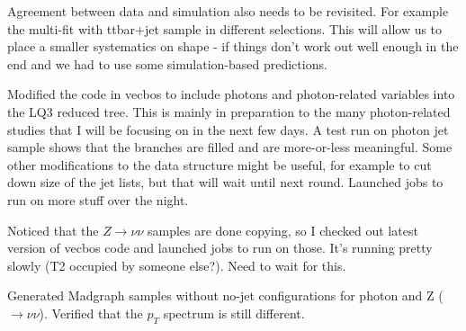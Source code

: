 Agreement between data and simulation also needs to be revisited.  For example the multi-fit with ttbar+jet
sample in different selections.  This will allow us to place a smaller systematics on shape - if things
don't work out well enough in the end and we had to use some simulation-based predictions.



Modified the code in vecbos to include photons and photon-related variables into the LQ3 reduced tree.
This is mainly in preparation to the many photon-related studies that I will be focusing on in the
next few days.  A test run on photon jet sample shows that the branches are filled and are more-or-less
meaningful.  Some other modifications to the data structure might be useful, for example to cut down
size of the jet lists, but that will wait until next round.  Launched jobs to run on more stuff over the night.

Noticed that the $Z\rightarrow\nu\nu$ samples are done copying, so I checked out latest version of
vecbos code and launched jobs to run on those.  It's running pretty slowly (T2 occupied by someone else?).
Need to wait for this.

Generated {\sc Madgraph} samples without no-jet configurations for photon and Z ($\rightarrow\nu\nu$).
Verified that the $p_T$ spectrum is still different.







